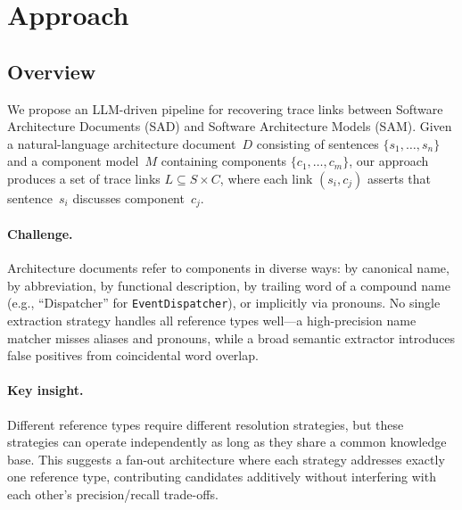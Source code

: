 
\section{Approach}\label{sec:approach}

\subsection{Overview}\label{sec:overview}

We propose an LLM-driven pipeline for recovering trace links between
Software Architecture Documents (SAD) and Software Architecture Models (SAM).
Given a natural-language architecture document~$D$ consisting of sentences
$\{s_1, \ldots, s_n\}$ and a component model~$M$ containing components
$\{c_1, \ldots, c_m\}$, our approach produces a set of trace links
$L \subseteq S \times C$, where each link $(s_i, c_j)$ asserts that
sentence~$s_i$ discusses component~$c_j$.

\paragraph{Challenge.}
Architecture documents refer to components in diverse ways:
by canonical name, by abbreviation, by functional description,
by trailing word of a compound name (e.g., ``Dispatcher'' for
\texttt{EventDispatcher}), or implicitly via pronouns.
No single extraction strategy handles all reference types
well---a high-precision name matcher misses aliases and pronouns,
while a broad semantic extractor introduces false positives from
coincidental word overlap.

\paragraph{Key insight.}
Different reference types require different resolution
strategies, but these strategies can operate independently as long
as they share a common knowledge base.
This suggests a fan-out architecture where each strategy addresses
exactly one reference type, contributing candidates additively without
interfering with each other's precision/recall trade-offs.

